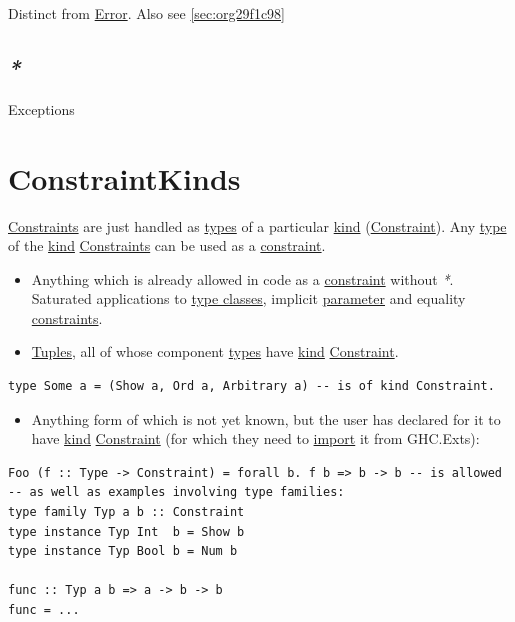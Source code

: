 \documentclass[a4paper,14pt,oneside]{book}
\begin{document}
Distinct from \hyperref[org16656dc]{Error}. Also see \ref{sec:org29f1c98}

\section{\emph{*}}
\label{sec:org52a4343}

\label{org7bb747a}Exceptions

\chapter{\label{org2d14f81}ConstraintKinds}
\label{sec:org56d1889}
\hyperref[org788ae0f]{Constraints} are just handled as \hyperref[org37402eb]{types} of a particular \hyperref[org243e7c6]{kind} (\hyperref[org0b3011b]{Constraint}).
Any \hyperref[org214d024]{type} of the \hyperref[org243e7c6]{kind} \hyperref[org788ae0f]{Constraints} can be used as a \hyperref[org0b3011b]{constraint}.
\begin{itemize}
\item Anything which is already allowed in code as a \hyperref[org0b3011b]{constraint} without \emph{*}. Saturated applications to \hyperref[orga70aaa5]{type classes}, implicit \hyperref[org76b257b]{parameter} and equality \hyperref[org788ae0f]{constraints}.
\item \hyperref[org64de9cf]{Tuples}, all of whose component \hyperref[org37402eb]{types} have \hyperref[org243e7c6]{kind} \hyperref[org0b3011b]{Constraint}.
\end{itemize}
\begin{verbatim}
type Some a = (Show a, Ord a, Arbitrary a) -- is of kind Constraint.
\end{verbatim}
\begin{itemize}
\item Anything form of which is not yet known, but the user has declared for it to have \hyperref[org243e7c6]{kind} \hyperref[org0b3011b]{Constraint} (for which they need to \hyperref[org16246b1]{import} it from GHC.Exts):
\end{itemize}
\begin{verbatim}
Foo (f :: Type -> Constraint) = forall b. f b => b -> b -- is allowed
-- as well as examples involving type families:
type family Typ a b :: Constraint
type instance Typ Int  b = Show b
type instance Typ Bool b = Num b

func :: Typ a b => a -> b -> b
func = ...
\end{verbatim}
\end{document}
